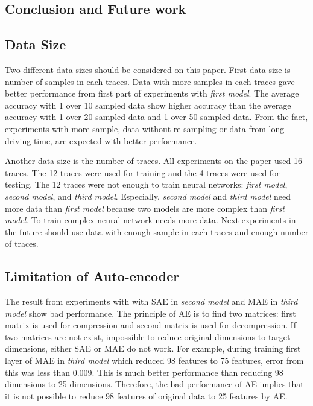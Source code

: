 \documentclass[draft,dvipsnames]{drexel-thesis}
\begin{document}
\begin{thesis}
\chapter{Conclusion and Future work}\label{chap:conclusion}
\section{Data Size}
Two different data sizes should be considered on this paper. First data size is number of samples in each traces. Data with more samples in each traces gave better performance from first part of experiments with {\em first model}. The average accuracy with 1 over 10 sampled data show higher accuracy than the average accuracy with 1 over 20 sampled data and 1 over 50 sampled data. From the fact, experiments with more sample, data without re-sampling or data from long driving time, are expected with better performance. 

Another data size is the number of traces. All experiments on the paper used 16 traces. The 12 traces were used for training and the 4 traces were used for testing. The 12 traces were not enough to train neural networks: {\em first model}, {\em second model}, and {\em third model}. Especially, {\em second model} and {\em third model} need more data than {\em first model} because two models are more complex than {\em first model}. To train complex neural network needs more data. Next experiments in the future should use data with enough sample in each traces and enough number of traces. 

\section{Limitation of Auto-encoder}
The result from experiments with with SAE in {\em second model} and MAE in {\em third model} show bad performance. The principle of AE is to find two matrices: first matrix is used for compression and second matrix is used for decompression. If two matrices are not exist, impossible to reduce original dimensions to target dimensions, either SAE or MAE do not work. For example, during training first layer of MAE in {\em third model} which reduced 98 features to 75 features, error from this was less than 0.009. This is much better performance than reducing 98 dimensions to 25 dimensions. Therefore, the bad performance of AE implies that it is not possible to reduce 98 features of original data to 25 features by AE.


\end{thesis}
\end{document}
